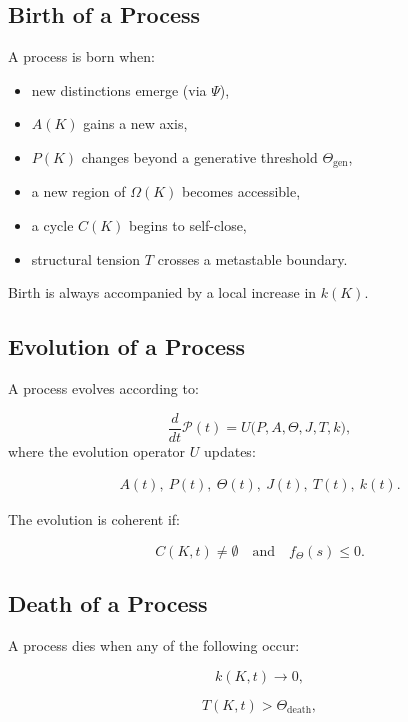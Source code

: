 \subsection{Birth of a Process}

A process is born when:

\begin{itemize}
    \item new distinctions emerge (via $\Psi$),
    \item $A(K)$ gains a new axis,
    \item $P(K)$ changes beyond a generative threshold $\Theta_{\mathrm{gen}}$,
    \item a new region of $\Omega(K)$ becomes accessible,
    \item a cycle $C(K)$ begins to self-close,
    \item structural tension $T$ crosses a metastable boundary.
\end{itemize}

Birth is always accompanied by a local increase in $k(K)$.

\subsection{Evolution of a Process}

A process evolves according to:

\[
\frac{d}{dt}\mathcal{P}(t) 
= U\bigl(P, A, \Theta, J, T, k\bigr),
\]
where the evolution operator $U$ updates:

\begin{align*}
A(t),\ 
P(t),\ 
\Theta(t),\ 
J(t),\ 
T(t),\ 
k(t).
\end{align*}

The evolution is coherent if:

\[
C(K,t) \neq \emptyset 
\quad\text{and}\quad
f_{\Theta}(s) \le 0.
\]

\subsection{Death of a Process}

A process dies when any of the following occur:

\[
k(K,t) \to 0,
\]

\[
T(K,t) > \Theta_{\mathrm{death}},
\]

